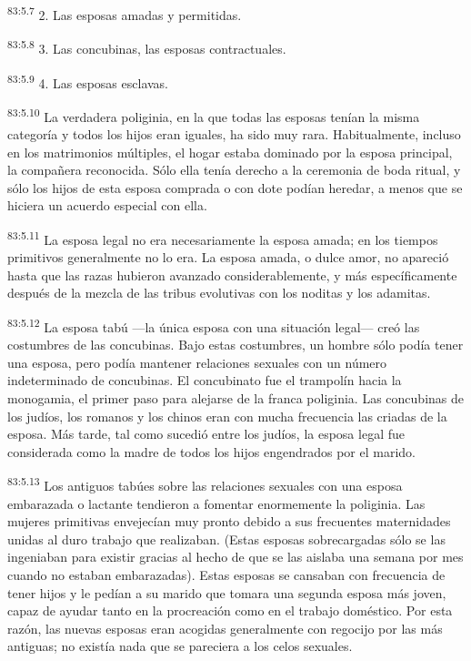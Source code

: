 \documentclass[twoside, 11pt]{book}
\begin{document}
\par
\textsuperscript{83:5.7} 2. Las esposas amadas y permitidas.

\par
\textsuperscript{83:5.8} 3. Las concubinas, las esposas contractuales.

\par
\textsuperscript{83:5.9} 4. Las esposas esclavas.

\par
\textsuperscript{83:5.10} La verdadera poliginia, en la que todas las esposas tenían la misma categoría y todos los hijos eran iguales, ha sido muy rara. Habitualmente, incluso en los matrimonios múltiples, el hogar estaba dominado por la esposa principal, la compañera reconocida. Sólo ella tenía derecho a la ceremonia de boda ritual, y sólo los hijos de esta esposa comprada o con dote podían heredar, a menos que se hiciera un acuerdo especial con ella.

\par
\textsuperscript{83:5.11} La esposa legal no era necesariamente la esposa amada; en los tiempos primitivos generalmente no lo era. La esposa amada, o dulce amor, no apareció hasta que las razas hubieron avanzado considerablemente, y más específicamente después de la mezcla de las tribus evolutivas con los noditas y los adamitas.

\par
\textsuperscript{83:5.12} La esposa tabú ---la única esposa con una situación legal--- creó las costumbres de las concubinas. Bajo estas costumbres, un hombre sólo podía tener una esposa, pero podía mantener relaciones sexuales con un número indeterminado de concubinas. El concubinato fue el trampolín hacia la monogamia, el primer paso para alejarse de la franca poliginia. Las concubinas de los judíos, los romanos y los chinos eran con mucha frecuencia las criadas de la esposa. Más tarde, tal como sucedió entre los judíos, la esposa legal fue considerada como la madre de todos los hijos engendrados por el marido.

\par
\textsuperscript{83:5.13} Los antiguos tabúes sobre las relaciones sexuales con una esposa embarazada o lactante tendieron a fomentar enormemente la poliginia. Las mujeres primitivas envejecían muy pronto debido a sus frecuentes maternidades unidas al duro trabajo que realizaban. (Estas esposas sobrecargadas sólo se las ingeniaban para existir gracias al hecho de que se las aislaba una semana por mes cuando no estaban embarazadas). Estas esposas se cansaban con frecuencia de tener hijos y le pedían a su marido que tomara una segunda esposa más joven, capaz de ayudar tanto en la procreación como en el trabajo doméstico. Por esta razón, las nuevas esposas eran acogidas generalmente con regocijo por las más antiguas; no existía nada que se pareciera a los celos sexuales.
\end{document}

